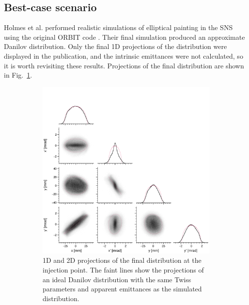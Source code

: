 \subsection{Best-case scenario}

Holmes et al. performed realistic simulations of elliptical painting in the SNS using the original ORBIT code \cite{Holmes2018}. Their final simulation produced an approximate Danilov distribution. Only the final 1D projections of the distribution were displayed in the publication, and the intrinsic emittances were not calculated, so it is worth revisiting these results. Projections of the final distribution are shown in Fig.~\ref{fig:Holmes_corner_compare}.
%
\begin{figure}[!p]
    \centering
    \begin{subfigure}{0.8\textwidth}
        \includegraphics[width=\textwidth]{Images/chapter3/Holmes_corner_compare.png}
        \caption{1D and 2D projections of the final distribution at the injection point. The faint lines show the projections of an ideal Danilov distribution with the same Twiss parameters and apparent emittances as the simulated distribution.}
        \label{fig:Holmes_corner_compare}
    \end{subfigure}
    \vfill
    \vspace*{1.25cm}
    \vfill
    \begin{subfigure}{0.5\textwidth}

\end{subfigure}
\end{figure}
